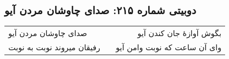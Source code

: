 \begin{center}
\section*{دوبیتی شماره ۲۱۵: صدای چاوشان مردن آیو}
\label{sec:215}
\begin{longtable}{l p{0.5cm} r}
صدای چاوشان مردن آیو
&&
بگوش آوازهٔ جان کندن آیو
\\
رفیقان میروند نوبت به نوبت
&&
وای آن ساعت که نوبت وامن آیو
\\
\end{longtable}
\end{center}
